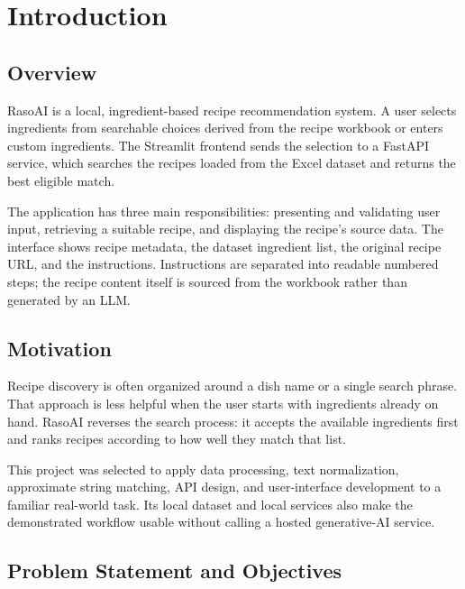 \documentclass[12pt,a4paper]{report}
\begin{document}
\setcounter{page}{1}

\chapter{Introduction}

\section{Overview}
\label{sec:intro_overview}

RasoAI is a local, ingredient-based recipe recommendation system. A user selects ingredients from searchable choices derived from the recipe workbook or enters custom ingredients. The Streamlit frontend sends the selection to a FastAPI service, which searches the recipes loaded from the Excel dataset and returns the best eligible match.

The application has three main responsibilities: presenting and validating user input, retrieving a suitable recipe, and displaying the recipe's source data. The interface shows recipe metadata, the dataset ingredient list, the original recipe URL, and the instructions. Instructions are separated into readable numbered steps; the recipe content itself is sourced from the workbook rather than generated by an LLM.

\section{Motivation}
\label{sec:intro_motivation}

Recipe discovery is often organized around a dish name or a single search phrase. That approach is less helpful when the user starts with ingredients already on hand. RasoAI reverses the search process: it accepts the available ingredients first and ranks recipes according to how well they match that list.

This project was selected to apply data processing, text normalization, approximate string matching, API design, and user-interface development to a familiar real-world task. Its local dataset and local services also make the demonstrated workflow usable without calling a hosted generative-AI service.

\section{Problem Statement and Objectives}
\label{sec:intro_problem}
\end{document}
